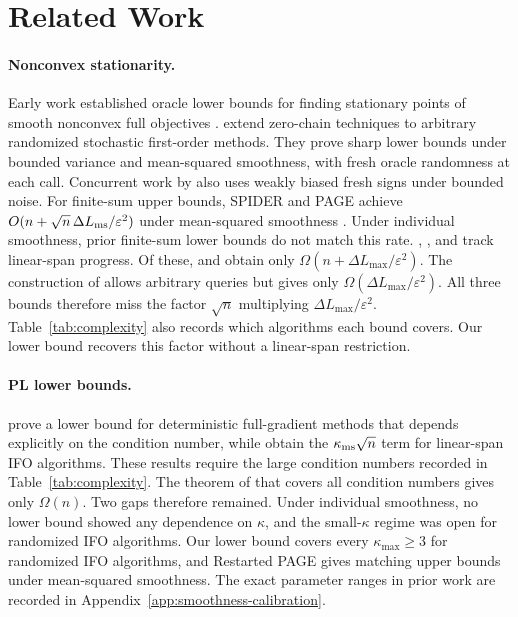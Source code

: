 \documentclass{article}
\theoremstyle{definition}
\begin{document}
\section{Related Work}
\label{sec:related}

\paragraph{Nonconvex stationarity.}
Early work established oracle lower bounds for finding stationary points
of smooth nonconvex full objectives
\citep{carmon2020lower1,carmon2021lower2}.
\citet{arjevani2023stochastic} extend zero-chain techniques to arbitrary
randomized stochastic first-order methods.  They prove sharp lower bounds under
bounded variance and mean-squared smoothness, with fresh oracle randomness at
each call.  Concurrent work by \citet{jin2026boundednoise} also uses weakly
biased fresh signs under bounded noise.  For finite-sum upper bounds, SPIDER
and PAGE achieve
$O(n+\sqrt n\,\Delta L_{\rm ms}/\varepsilon^2)$ under mean-squared smoothness
\citep{fang2018spider,li2021page}.  Under individual smoothness, prior
finite-sum lower bounds do not match this rate.  \citet{zhou2019lower},
\citet{xie2019framework}, and \citet{han2024lower} track linear-span progress.
Of these, \citet{zhou2019lower} and \citet{han2024lower}
obtain only $\Omega(n+\Delta L_{\max}/\varepsilon^2)$.  The construction of
\citet{emmenegger2022oracle} allows arbitrary queries but gives only
$\Omega(\Delta L_{\max}/\varepsilon^2)$.  All three bounds therefore miss the
factor $\sqrt n$ multiplying $\Delta L_{\max}/\varepsilon^2$.
Table~\ref{tab:complexity}
also records which algorithms each bound covers.  Our lower bound recovers this
factor without a linear-span restriction.

\paragraph{PL lower bounds.}
\citet{yue2023lower} prove a lower bound for deterministic full-gradient
methods that depends explicitly on the condition number, while
\citet{bai2024complexity} obtain the
$\kappa_{\rm ms}\sqrt n$ term for linear-span IFO algorithms.  These
results require the large condition numbers recorded in
Table~\ref{tab:complexity}.  The theorem of \citet{bai2024complexity} that
covers all condition numbers gives only $\Omega(n)$.  Two gaps therefore
remained.  Under individual smoothness, no lower bound showed any dependence
on $\kappa$, and the small-$\kappa$ regime was open for randomized IFO
algorithms.  Our lower bound covers every
$\kappa_{\max}\ge3$ for randomized IFO algorithms, and Restarted PAGE gives
matching upper bounds under mean-squared smoothness.  The exact
parameter ranges in prior work are recorded in
Appendix~\ref{app:smoothness-calibration}.
\end{document}
